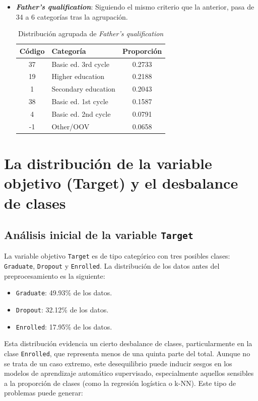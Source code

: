 \documentclass{report}[14pt]
\begin{document}
\begin{itemize}
    \item \textbf{\textit{Father's qualification}}: Siguiendo el mismo criterio que la anterior, pasa de 34 a 6 categorías tras la agrupación.
    \begin{table}[H]
    \centering
    \begin{tabular}{|c|l|c|}
        \hline
        \textbf{Código} & \textbf{Categoría} & \textbf{Proporción} \\
        \hline
        37 & Basic ed. 3rd cycle & 0.2733 \\
        19 & Higher education & 0.2188 \\
        1 & Secondary education & 0.2043 \\
        38 & Basic ed. 1st cycle & 0.1587 \\
        4 & Basic ed. 2nd cycle & 0.0791 \\
        -1 & Other/OOV & 0.0658 \\
        \hline
    \end{tabular}
    \caption{Distribución agrupada de \textit{Father's qualification}}
    \label{tab:fathers_qualification}
    \end{table}
\end{itemize}

\section{La distribución de la variable objetivo (Target) y el desbalance de clases}
\label{sec:target-balance}

\subsection{Análisis inicial de la variable \texttt{Target}}

La variable objetivo \texttt{Target} es de tipo categórico con tres posibles clases: \texttt{Graduate}, \texttt{Dropout} y \texttt{Enrolled}. La distribución de los datos antes del preprocesamiento es la siguiente:

\begin{itemize}
    \item \texttt{Graduate}: 49.93\% de los datos.
    \item \texttt{Dropout}: 32.12\% de los datos.
    \item \texttt{Enrolled}: 17.95\% de los datos.
\end{itemize}

Esta distribución evidencia un cierto desbalance de clases, particularmente en la clase \texttt{Enrolled}, que representa menos de una quinta parte del total. Aunque no se trata de un caso extremo, este desequilibrio puede inducir sesgos en los modelos de aprendizaje automático supervisado, especialmente aquellos sensibles a la proporción de clases (como la regresión logística o k-NN). Este tipo de problemas puede generar:
\end{document}

